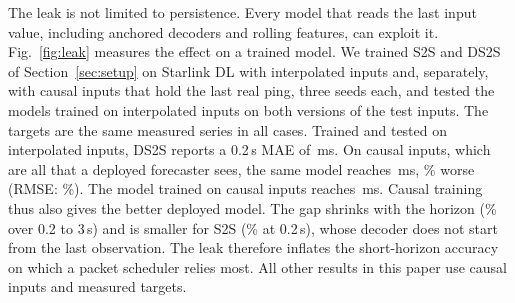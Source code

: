 The leak is not limited to persistence. Every model that reads the last input value, including anchored decoders and rolling features, can exploit it. Fig.~\ref{fig:leak} measures the effect on a trained model. We trained S2S and DS2S of Section~\ref{sec:setup} on Starlink DL with interpolated inputs and, separately, with causal inputs that hold the last real ping, three seeds each, and tested the models trained on interpolated inputs on both versions of the test inputs. The targets are the same measured series in all cases. Trained and tested on interpolated inputs, DS2S reports a 0.2\,s MAE of \LeakDSAhOne\,ms. On causal inputs, which are all that a deployed forecaster sees, the same model reaches \LeakDSBhOne\,ms, \LeakOptDSMAEhOne\% worse (RMSE: \LeakOptDSRMSEhOne\%). The model trained on causal inputs reaches \LeakDSChOne\,ms. Causal training thus also gives the better deployed model. The gap shrinks with the horizon (\LeakOptDSMAEavg\% over 0.2 to 3\,s) and is smaller for S2S (\LeakOptSSMAEhOne\% at 0.2\,s), whose decoder does not start from the last observation. The leak therefore inflates the short-horizon accuracy on which a packet scheduler relies most. All other results in this paper use causal inputs and measured targets.
